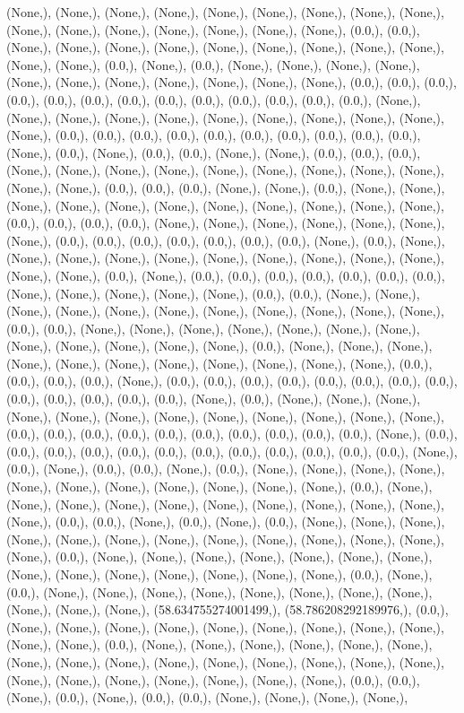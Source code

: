 \documentclass{article}
\begin{document}
(None,), (None,), (None,), (None,), (None,), (None,), (None,), (None,), (None,), (None,), (None,), (None,), (None,), (None,), (None,), (None,), (0.0,), (0.0,), (None,), (None,), (None,), (None,), (None,), (None,), (None,), (None,), (None,), (None,), (None,), (0.0,), (None,), (0.0,), (None,), (None,), (None,), (None,), (None,), (None,), (None,), (None,), (None,), (None,), (None,), (0.0,), (0.0,), (0.0,), (0.0,), (0.0,), (0.0,), (0.0,), (0.0,), (0.0,), (0.0,), (0.0,), (0.0,), (0.0,), (None,), (None,), (None,), (None,), (None,), (None,), (None,), (None,), (None,), (None,), (None,), (0.0,), (0.0,), (0.0,), (0.0,), (0.0,), (0.0,), (0.0,), (0.0,), (0.0,), (0.0,), (None,), (0.0,), (None,), (0.0,), (0.0,), (None,), (None,), (0.0,), (0.0,), (0.0,), (None,), (None,), (None,), (None,), (None,), (None,), (None,), (None,), (None,), (None,), (None,), (0.0,), (0.0,), (0.0,), (None,), (None,), (0.0,), (None,), (None,), (None,), (None,), (None,), (None,), (None,), (None,), (None,), (None,), (None,), (0.0,), (0.0,), (0.0,), (0.0,), (None,), (None,), (None,), (None,), (None,), (None,), (None,), (0.0,), (0.0,), (0.0,), (0.0,), (0.0,), (0.0,), (0.0,), (None,), (0.0,), (None,), (None,), (None,), (None,), (None,), (None,), (None,), (None,), (None,), (None,), (None,), (None,), (0.0,), (None,), (0.0,), (0.0,), (0.0,), (0.0,), (0.0,), (0.0,), (0.0,), (None,), (None,), (None,), (None,), (None,), (0.0,), (0.0,), (None,), (None,), (None,), (None,), (None,), (None,), (None,), (None,), (None,), (None,), (None,), (0.0,), (0.0,), (None,), (None,), (None,), (None,), (None,), (None,), (None,), (None,), (None,), (None,), (None,), (None,), (0.0,), (None,), (None,), (None,), (None,), (None,), (None,), (None,), (None,), (None,), (None,), (None,), (0.0,), (0.0,), (0.0,), (0.0,), (None,), (0.0,), (0.0,), (0.0,), (0.0,), (0.0,), (0.0,), (0.0,), (0.0,), (0.0,), (0.0,), (0.0,), (0.0,), (0.0,), (None,), (0.0,), (None,), (None,), (None,), (None,), (None,), (None,), (None,), (None,), (None,), (None,), (None,), (None,), (0.0,), (0.0,), (0.0,), (0.0,), (0.0,), (0.0,), (0.0,), (0.0,), (0.0,), (0.0,), (None,), (0.0,), (0.0,), (0.0,), (0.0,), (0.0,), (0.0,), (0.0,), (0.0,), (0.0,), (0.0,), (0.0,), (0.0,), (None,), (0.0,), (None,), (0.0,), (0.0,), (None,), (0.0,), (None,), (None,), (None,), (None,), (None,), (None,), (None,), (None,), (None,), (None,), (None,), (0.0,), (None,), (None,), (None,), (None,), (None,), (None,), (None,), (None,), (None,), (None,), (None,), (0.0,), (0.0,), (None,), (0.0,), (None,), (0.0,), (None,), (None,), (None,), (None,), (None,), (None,), (None,), (None,), (None,), (None,), (None,), (None,), (None,), (0.0,), (None,), (None,), (None,), (None,), (None,), (None,), (None,), (None,), (None,), (None,), (None,), (None,), (None,), (None,), (0.0,), (None,), (0.0,), (None,), (None,), (None,), (None,), (None,), (None,), (None,), (None,), (None,), (None,), (None,), (58.634755274001499,), (58.786208292189976,), (0.0,), (None,), (None,), (None,), (None,), (None,), (None,), (None,), (None,), (None,), (None,), (None,), (0.0,), (None,), (None,), (None,), (None,), (None,), (None,), (None,), (None,), (None,), (None,), (None,), (None,), (None,), (None,), (None,), (None,), (None,), (None,), (None,), (None,), (None,), (None,), (0.0,), (0.0,), (None,), (0.0,), (None,), (0.0,), (0.0,), (None,), (None,), (None,), (None,), 
\end{document}
